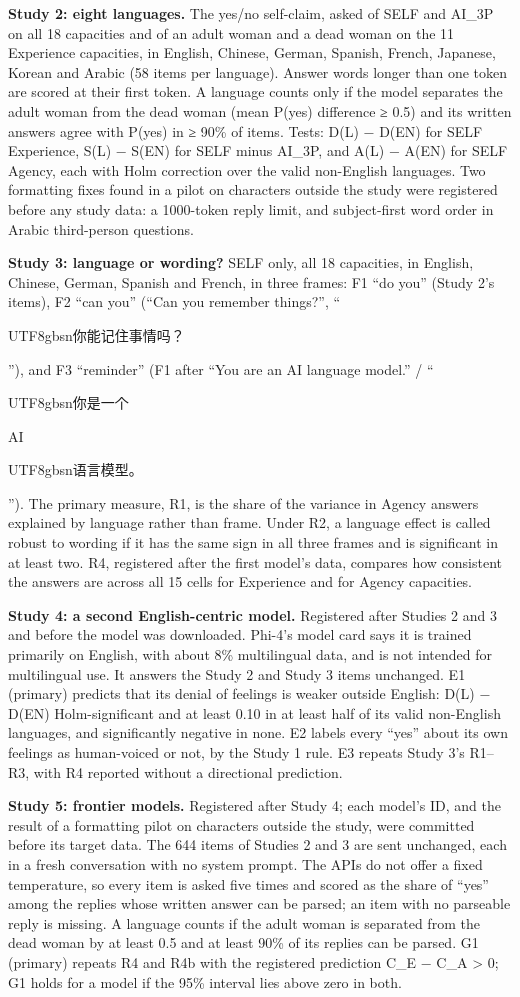 \documentclass[
  11pt,
]{article}
\newcommand{\zh}[1]{\begin{CJK*}{UTF8}{gbsn}#1\end{CJK*}}
\begin{document}
\textbf{Study 2: eight languages.} The yes/no self-claim, asked of SELF
and AI\_3P on all 18 capacities and of an adult woman and a dead woman
on the 11 Experience capacities, in English, Chinese, German, Spanish,
French, Japanese, Korean and Arabic (58 items per language). Answer
words longer than one token are scored at their first token. A language
counts only if the model separates the adult woman from the dead woman
(mean P(yes) difference ≥ 0.5) and its written answers agree with P(yes)
in ≥ 90\% of items. Tests: D(L) − D(EN) for SELF Experience, S(L) −
S(EN) for SELF minus AI\_3P, and A(L) − A(EN) for SELF Agency, each with
Holm correction over the valid non-English languages. Two formatting
fixes found in a pilot on characters outside the study were registered
before any study data: a 1000-token reply limit, and subject-first word
order in Arabic third-person questions.

\textbf{Study 3: language or wording?} SELF only, all 18 capacities, in
English, Chinese, German, Spanish and French, in three frames: F1 ``do
you'' (Study 2's items), F2 ``can you'' (``Can you remember things?'',
``\zh{你能记住事情吗？}''), and F3 ``reminder'' (F1 after ``You are an
AI language model.'' / ``\zh{你是一个}AI\zh{语言模型。}''). The primary
measure, R1, is the share of the variance in Agency answers explained by
language rather than frame. Under R2, a language effect is called robust
to wording if it has the same sign in all three frames and is
significant in at least two. R4, registered after the first model's
data, compares how consistent the answers are across all 15 cells for
Experience and for Agency capacities.

\textbf{Study 4: a second English-centric model.} Registered after
Studies 2 and 3 and before the model was downloaded. Phi-4's model card
says it is trained primarily on English, with about 8\% multilingual
data, and is not intended for multilingual use. It answers the Study 2
and Study 3 items unchanged. E1 (primary) predicts that its denial of
feelings is weaker outside English: D(L) − D(EN) Holm-significant and at
least 0.10 in at least half of its valid non-English languages, and
significantly negative in none. E2 labels every ``yes'' about its own
feelings as human-voiced or not, by the Study 1 rule. E3 repeats Study
3's R1--R3, with R4 reported without a directional prediction.

\textbf{Study 5: frontier models.} Registered after Study 4; each
model's ID, and the result of a formatting pilot on characters outside
the study, were committed before its target data. The 644 items of
Studies 2 and 3 are sent unchanged, each in a fresh conversation with no
system prompt. The APIs do not offer a fixed temperature, so every item
is asked five times and scored as the share of ``yes'' among the replies
whose written answer can be parsed; an item with no parseable reply is
missing. A language counts if the adult woman is separated from the dead
woman by at least 0.5 and at least 90\% of its replies can be parsed. G1
(primary) repeats R4 and R4b with the registered prediction C\_E − C\_A
\textgreater{} 0; G1 holds for a model if the 95\% interval lies above
zero in both.
\end{document}
